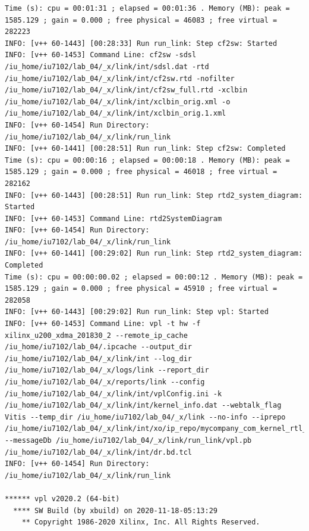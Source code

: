 \begin{lstlisting}[label=code, basicstyle=\tiny, caption=Листинг файла v++\_vinc.log]
Time (s): cpu = 00:01:31 ; elapsed = 00:01:36 . Memory (MB): peak = 1585.129 ; gain = 0.000 ; free physical = 46083 ; free virtual = 282223
INFO: [v++ 60-1443] [00:28:33] Run run_link: Step cf2sw: Started
INFO: [v++ 60-1453] Command Line: cf2sw -sdsl /iu_home/iu7102/lab_04/_x/link/int/sdsl.dat -rtd /iu_home/iu7102/lab_04/_x/link/int/cf2sw.rtd -nofilter /iu_home/iu7102/lab_04/_x/link/int/cf2sw_full.rtd -xclbin /iu_home/iu7102/lab_04/_x/link/int/xclbin_orig.xml -o /iu_home/iu7102/lab_04/_x/link/int/xclbin_orig.1.xml
INFO: [v++ 60-1454] Run Directory: /iu_home/iu7102/lab_04/_x/link/run_link
INFO: [v++ 60-1441] [00:28:51] Run run_link: Step cf2sw: Completed
Time (s): cpu = 00:00:16 ; elapsed = 00:00:18 . Memory (MB): peak = 1585.129 ; gain = 0.000 ; free physical = 46018 ; free virtual = 282162
INFO: [v++ 60-1443] [00:28:51] Run run_link: Step rtd2_system_diagram: Started
INFO: [v++ 60-1453] Command Line: rtd2SystemDiagram
INFO: [v++ 60-1454] Run Directory: /iu_home/iu7102/lab_04/_x/link/run_link
INFO: [v++ 60-1441] [00:29:02] Run run_link: Step rtd2_system_diagram: Completed
Time (s): cpu = 00:00:00.02 ; elapsed = 00:00:12 . Memory (MB): peak = 1585.129 ; gain = 0.000 ; free physical = 45910 ; free virtual = 282058
INFO: [v++ 60-1443] [00:29:02] Run run_link: Step vpl: Started
INFO: [v++ 60-1453] Command Line: vpl -t hw -f xilinx_u200_xdma_201830_2 --remote_ip_cache /iu_home/iu7102/lab_04/.ipcache --output_dir /iu_home/iu7102/lab_04/_x/link/int --log_dir /iu_home/iu7102/lab_04/_x/logs/link --report_dir /iu_home/iu7102/lab_04/_x/reports/link --config /iu_home/iu7102/lab_04/_x/link/int/vplConfig.ini -k /iu_home/iu7102/lab_04/_x/link/int/kernel_info.dat --webtalk_flag Vitis --temp_dir /iu_home/iu7102/lab_04/_x/link --no-info --iprepo /iu_home/iu7102/lab_04/_x/link/int/xo/ip_repo/mycompany_com_kernel_rtl_kernel_wizard_0_1_0 --messageDb /iu_home/iu7102/lab_04/_x/link/run_link/vpl.pb /iu_home/iu7102/lab_04/_x/link/int/dr.bd.tcl
INFO: [v++ 60-1454] Run Directory: /iu_home/iu7102/lab_04/_x/link/run_link

****** vpl v2020.2 (64-bit)
  **** SW Build (by xbuild) on 2020-11-18-05:13:29
    ** Copyright 1986-2020 Xilinx, Inc. All Rights Reserved.


\end{lstlisting}
